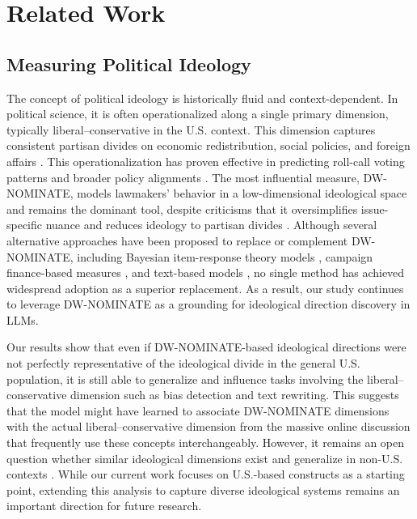 \documentclass[11pt]{article}
\begin{document}
\section{Related Work}
\subsection{Measuring Political Ideology}

The concept of political ideology is historically fluid and context-dependent. In political science, it is often operationalized along a single primary dimension, typically liberal--conservative in the U.S. context. This dimension captures consistent partisan divides on economic redistribution, social policies, and foreign affairs \citep{pooleSpatialModelsParliamentary2005, mccartyDefenseDWNOMINATE2016}. This operationalization has proven effective in predicting roll-call voting patterns and broader policy alignments \citep{carrollMeasuringBiasUncertainty2009}. The most influential measure, DW-NOMINATE, models lawmakers’ behavior in a low-dimensional ideological space and remains the dominant tool, despite criticisms that it oversimplifies issue-specific nuance and reduces ideology to partisan divides \citep{mccartyDefenseDWNOMINATE2016}. Although several alternative approaches have been proposed to replace or complement DW-NOMINATE, including Bayesian item-response theory models \citep{caugheyDynamicEstimationLatent2015}, campaign finance-based measures \citep{bonicaMappingIdeologicalMarketplace2014}, and text-based models \citep{vafaTextBasedIdealPoints2020}, no single method has achieved widespread adoption as a superior replacement. As a result, our study continues to leverage DW-NOMINATE as a grounding for ideological direction discovery in LLMs.

Our results show that even if DW-NOMINATE-based ideological directions were not perfectly representative of the ideological divide in the general U.S. population, it is still able to generalize and influence tasks involving the liberal--conservative dimension such as bias detection and text rewriting. This suggests that the model might have learned to associate DW-NOMINATE dimensions with the actual liberal--conservative dimension from the massive online discussion that frequently use these concepts interchangeably. However, it remains an open question whether similar ideological dimensions exist and generalize in non-U.S. contexts \citep{haerpferWorldValuesSurvey2024, inglehartCulturalEvolutionPeoples2018}. While our current work focuses on U.S.-based constructs as a starting point, extending this analysis to capture diverse ideological systems remains an important direction for future research.
\end{document}
